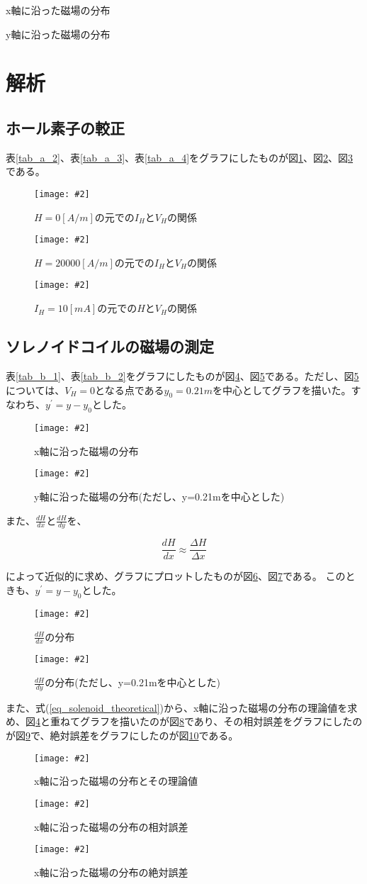 \documentclass[uplatex,11pt]{jsarticle}
\newcommand{\cir}[3]{ %
    \begin{figure}
        \begin{center}
            \texttt{[image: \#2]}
            \caption{#3}
            \label{fg_#1}
         \end{center}
    \end{figure}
}
\newcommand{\tab}[4]{ %
    \begin{table}[htb]
        \centering
        \caption{#3}
        
        \label{tab_#1}
    \end{table}
}
\newcommand{\fr}[1]{図\ref{fg_#1}}
\newcommand{\tr}[1]{表\ref{tab_#1}}
\newcommand{\er}[1]{式(\ref{#1})}
\begin{document}
\tab{b_1}{./csv/jikken_b_1.csv}{x軸に沿った磁場の分布}{3}
\tab{b_2}{./csv/jikken_b_2.csv}{y軸に沿った磁場の分布}{3}

\section{解析}
\subsection{ホール素子の較正}

\tr{a_2}、\tr{a_3}、\tr{a_4}をグラフにしたものが\fr{a_2}、\fr{a_3}、\fr{a_4}である。

\cir{a_2}{./graph/jikken_a_2.png}{ $ H=0[A/m] $の元での$I_H$と$V_H$の関係 }
\cir{a_3}{./graph/jikken_a_3.png}{ $ H=20000[A/m] $の元での$I_H$と$V_H$の関係 }
\cir{a_4}{./graph/jikken_a_4.png}{ $ I_H = 10[mA] $の元での$H$と$V_H$の関係 }

\subsection{ソレノイドコイルの磁場の測定}

\tr{b_1}、\tr{b_2}をグラフにしたものが\fr{b_1}、\fr{b_2}である。ただし、\fr{b_2}については、$V_H = 0$となる点である$y_0=0.21m$を中心としてグラフを描いた。すなわち、$y^{\prime} = y - y_0$とした。

\cir{b_1}{./graph/jikken_b_1.png}{ x軸に沿った磁場の分布 }
\cir{b_2}{./graph/jikken_b_2.png}{ y軸に沿った磁場の分布(ただし、y=0.21mを中心とした) }

また、$ \frac{dH}{dx} $と$ \frac{dH}{dy} $を、

\[
    \frac{dH}{dx} \approx \frac{\Delta H}{ \Delta x }
\]

によって近似的に求め、グラフにプロットしたものが\fr{b_1_differential}、\fr{b_2_differential}である。
このときも、$y^{\prime} = y - y_0$とした。

\cir{b_1_differential}{./graph/jikken_b_1_differential.png}{ $\frac{dH}{dx}$の分布 }
\cir{b_2_differential}{./graph/jikken_b_2_differential.png}{ $\frac{dH}{dy}$の分布(ただし、y=0.21mを中心とした) }

また、\er{eq_solenoid_theoretical}から、x軸に沿った磁場の分布の理論値を求め、\fr{b_1}と重ねてグラフを描いたのが\fr{b_1_theoretical_comparizon}であり、その相対誤差をグラフにしたのが\fr{b_1_relative_error}で、絶対誤差をグラフにしたのが\fr{b_1_absolute_error}である。

\cir{b_1_theoretical_comparizon}{./graph/jikken_b_1_theoretical_comparizon.png}{ x軸に沿った磁場の分布とその理論値 }
\cir{b_1_relative_error}{./graph/jikken_b_1_relative_error.png}{ x軸に沿った磁場の分布の相対誤差 }
\cir{b_1_absolute_error}{./graph/jikken_b_1_absolute_error.png}{ x軸に沿った磁場の分布の絶対誤差 }
\end{document}
